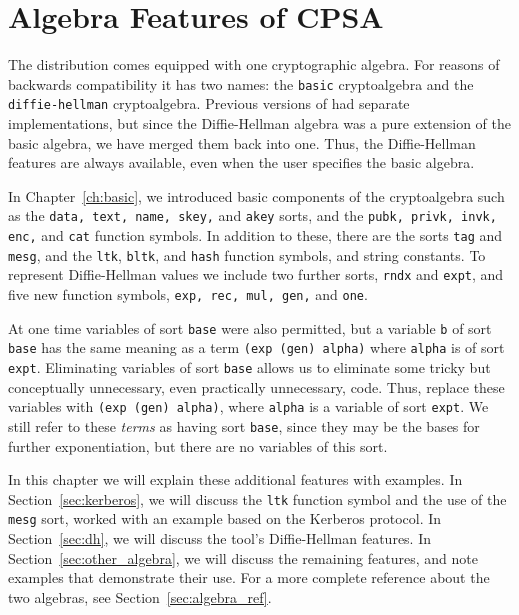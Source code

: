 \chapter{Algebra Features of CPSA}
\label{ch:algebra}

 The {\cpsa} distribution comes equipped
with one cryptographic algebra. For reasons of backwards compatibility
it has two names: the \texttt{basic} cryptoalgebra and the
\texttt{diffie-hellman} cryptoalgebra. Previous versions of {\cpsa}
had separate implementations, but since the Diffie-Hellman algebra was
a pure extension of the basic algebra, we have merged them back into
one. Thus, the Diffie-Hellman features are always available, even when
the user specifies the basic algebra.

In Chapter~\ref{ch:basic}, we introduced basic components of the
cryptoalgebra such as the \texttt{data, text, name, skey,} and
\texttt{akey} sorts, and the \texttt{pubk, privk, invk, enc,} and
\texttt{cat} function symbols.  In addition to these, there are the
sorts  \texttt{tag} and \texttt{mesg}, and the
\texttt{ltk}, \texttt{bltk}, and \texttt{hash} function symbols, and
string constants. To represent Diffie-Hellman values we include two
further sorts, \texttt{rndx} and \texttt{expt}, and five new function
symbols, \texttt{exp, rec, mul, gen,} and \texttt{one}.

At one time variables of sort \texttt{base} were also permitted, but a
variable \texttt{b} of sort \texttt{base} has the same meaning as a
term \texttt{(exp (gen) alpha)} where \texttt{alpha} is of sort
\texttt{expt}.  Eliminating variables of sort \texttt{base} allows us
to eliminate some tricky but conceptually unnecessary, even
practically unnecessary, code.  Thus, replace these variables with
\texttt{(exp (gen) alpha)}, where \texttt{alpha} is a variable of sort
\texttt{expt}.  We still refer to these \emph{terms} as having sort
\texttt{base}, since they may be the bases for further exponentiation,
but there are no variables of this sort.

In this chapter we will explain these additional features with
examples.  In Section~\ref{sec:kerberos}, we will discuss the
\texttt{ltk} function symbol and the use of the \texttt{mesg} sort,
worked with an example based on the Kerberos protocol.  In
Section~\ref{sec:dh}, we will discuss the tool's Diffie-Hellman
features.  In Section~\ref{sec:other_algebra}, we will discuss the
remaining features, and note examples that demonstrate their use.
For a more complete reference about the two algebras, see Section~\ref{sec:algebra_ref}.


